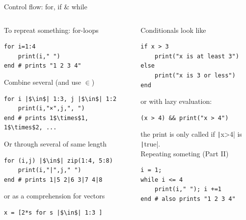 \documentclass[aspectratio=169, 12pt]{beamer}
\begin{document}
    \begin{frame}[fragile]{Control flow: for, if \& while}
        \vspace{-.25\baselineskip}
        \begin{columns}[T]
            \begin{column}{.5\textwidth}
                To repreat something: for-loops
                \begin{verbatim}
for i=1:4
    print(i," ")
end # prints "1 2 3 4"
                \end{verbatim}
                \pause
                Combine several (and use $\in$)
                \begin{verbatim}
for i |$\in$| 1:3, j |$\in$| 1:2
    print(i,"×",j,", ")
end # prints 1$\times$1, 1$\times$2, ...
                \end{verbatim}
                \pause
                Or through several of same length
                \begin{verbatim}
for (i,j) |$\in$| zip(1:4, 5:8)
    print(i,"|",j," ")
end # prints 1|5 2|6 3|7 4|8
                \end{verbatim}
                \pause
                or as a \alert{comprehension} for vectors
                \begin{verbatim}
x = [2*s for s |$\in$| 1:3 ]
                \end{verbatim}
            \end{column}
            \pause
            \begin{column}{.5\textwidth}
                Conditionals look like
                \begin{verbatim}
if x > 3
    print("x is at least 3")
else
    print("x is 3 or less")
end
                \end{verbatim}
                \pause
                or with \alert{lazy evaluation}:
                \begin{verbatim}
(x > 4) && print("x > 4")
                \end{verbatim}
                the print is only called if \texttt|x>4| is \texttt|true|.
                \\[.5\baselineskip]
                Repeating someting (Part II)
                \begin{verbatim}
i = 1;
while i <= 4
    print(i," "); i +=1
end # also prints "1 2 3 4"
                \end{verbatim}
            \end{column}
        \end{columns}
    \end{frame}
\end{document}

